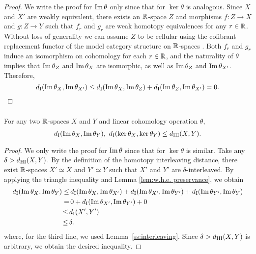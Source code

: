 \begin{proof}
	We write the proof for $\operatorname{Im}\theta$ only since that for $\ker\theta$ is analogous.
	Since $X$ and $X'$ are weakly equivalent, there exists an $\mathbb{R}$-space $Z$ and morphisms $f \colon Z \to X$ and $g \colon Z \to Y$ such that $f_r$ and $g_r$ are weak homotopy equivalences for any $r \in \mathbb{R}$.
	Without loss of generality we can assume $Z$ to be cellular using the cofibrant replacement functor of the model category structure on $\mathbb{R}$-spaces \cite{blumberg2023interleaving}.
    Both $f_r$ and $g_r$ induce an isomorphism on cohomology for each $r \in \mathbb{R}$, and the naturality of $\theta$ implies that $\operatorname{Im}\theta_{Z}$ and $\operatorname{Im}\theta_{X}$ are isomorphic, as well as $\operatorname{Im}\theta_{Z}$ and $\operatorname{Im}\theta_{X'}$. 
	Therefore,
	\[
	d_{\mathrm{I}}(\operatorname{Im}\theta_{X},\operatorname{Im}\theta_{X'}) \leq
	d_{\mathrm{I}}(\operatorname{Im}\theta_{X},\operatorname{Im}\theta_{Z}) + d_{\mathrm{I}}(\operatorname{Im}\theta_{Z},\operatorname{Im}\theta_{X'}) =
	0.\qedhere
	\]
\end{proof}

\subsubsection{}\label{thm:theta stability}
\theorem For any two $\mathbb{R}$-spaces $X$ and $Y$ and linear cohomology operation $\theta$,
\begin{align*}
	d_{\mathrm{I}}(\operatorname{Im}\theta_{X}, \operatorname{Im}\theta_{Y}),\ d_{\mathrm{I}}(\ker\theta_{X}, \ker\theta_{Y}) \leq d_{\mathrm{HI}}(X,Y).
\end{align*}

\begin{proof}
	We only write the proof for $\operatorname{Im}\theta$ since that for $\ker\theta$ is similar.
	Take any $\delta > d_{\mathrm{HI}}(X,Y)$.
	By the definition of the homotopy interleaving distance, there exist $\mathbb{R}$-spaces $X' \simeq X$ and $Y' \simeq Y$ such that $X'$ and $Y'$ are $\delta$-interleaved.
	By applying the triangle inequality and Lemma \ref{lem:w.h.e. preservance}, we obtain
	\begin{align*}
		d_{\mathrm{I}}(\operatorname{Im}\theta_{X}, \operatorname{Im}\theta_{Y}) \leq& \,
		d_{\mathrm{I}}(\operatorname{Im}\theta_{X}, \operatorname{Im}\theta_{X'}) + d_{\mathrm{I}}(\operatorname{Im}\theta_{X'}, \operatorname{Im}\theta_{Y'}) + d_{\mathrm{I}}(\operatorname{Im}\theta_{Y'}, \operatorname{Im}\theta_{Y}) \\ =& \, 
		0 + d_{\mathrm{I}}(\operatorname{Im}\theta_{X'}, \operatorname{Im}\theta_{Y'}) + 0 \\ \leq \,&
		d_{\mathrm{I}}(X',Y') \\ \leq \,&
		\delta.
	\end{align*}
	where, for the third line, we used Lemma~\ref{ss:interleaving}.
 	Since $\delta > d_{\mathrm{HI}}(X,Y)$ is arbitrary, we obtain the desired inequality.
\end{proof}

